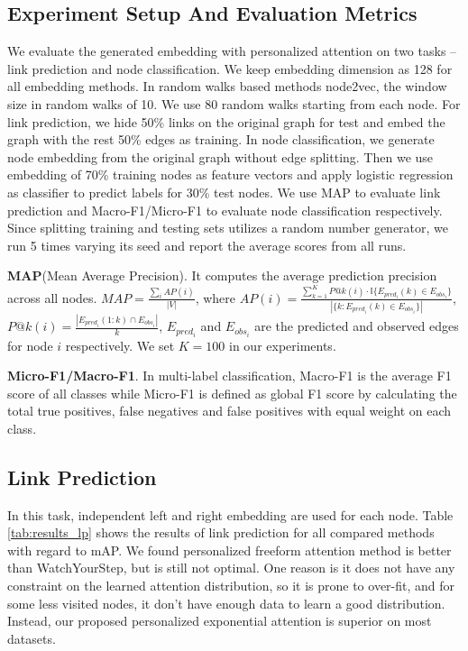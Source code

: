 \documentclass{article}
\begin{document}
\subsection{Experiment Setup And Evaluation Metrics}
We evaluate the generated embedding with personalized attention on two tasks -- link prediction and node classification. We keep embedding dimension as 128 for all embedding methods. In random walks based methods node2vec,  the window size in random walks of 10. We use 80 random walks starting from each node. For link prediction, we hide 50\% links on the original graph for test and embed the graph with the rest 50\% edges as training. In node classification, we generate node embedding from the original graph without edge splitting. Then we use embedding of 70\% training nodes as feature vectors and apply logistic regression as classifier to predict labels for 30\% test nodes. We use MAP to evaluate link prediction and Macro-F1/Micro-F1 to evaluate node classification respectively. Since splitting training and testing sets utilizes a random number generator, we run 5 times varying its seed and report the average scores from all runs.


 
\textbf{MAP}(Mean Average Precision). It computes the average prediction precision across all nodes. $MAP=\frac{\sum_i AP(i)}{|V|}$,
where $AP(i) = \frac{\sum_{k=1}^K P@k(i) \cdot \mathbb{I}\{E_{pred_i}(k) \in E_{obs_i}\}}{|\{k: E_{pred_i}(k) \in E_{obs_i}\}|}$, $P@k(i) = \frac{|E_{pred_i}(1:k) \cap E_{obs_i}|}{k}$, $E_{pred_i}$ and $E_{obs_i}$ are the predicted and observed edges for node $i$ respectively. We set $K=100$ in our experiments.

\textbf{Micro-F1/Macro-F1}. In multi-label classification, Macro-F1 is the average F1 score of all classes while Micro-F1 is defined as global F1 score by calculating the total true positives, false negatives and false positives with equal weight on each class.



 
\subsection{Link Prediction}
In this task, independent left and right embedding are used for each node.
Table \ref{tab:results_lp} shows the results of link prediction for all compared methods with regard to mAP.
We found personalized freeform attention method is better than WatchYourStep, but is still not optimal. One reason is it does not have any constraint on the learned attention distribution, so it is prone to over-fit, and for some less visited nodes, it don't have enough data to learn a good distribution. Instead, our proposed personalized exponential attention is superior on most datasets.
\end{document}
